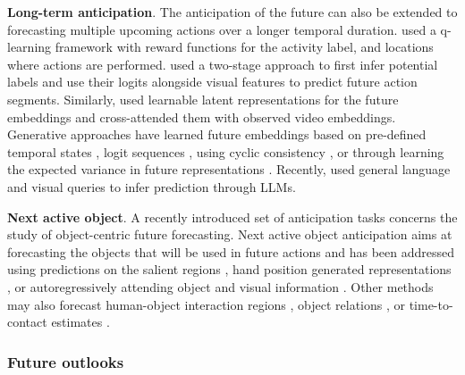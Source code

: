 \noindent
\textbf{Long-term anticipation}. The anticipation of the future can also be extended to forecasting multiple upcoming actions over a longer temporal duration. \citet{bokhari2017long} used a q-learning framework with reward functions for the activity label, and locations where actions are performed. \citet{nawhal2022rethinking} used a two-stage approach to first infer potential labels and use their logits alongside visual features to predict future action segments. Similarly, \citet{gong2022future} used learnable latent representations for the future embeddings and cross-attended \citep{jaegle2021perceiver,lee2019set} them with observed video embeddings. Generative approaches have learned future embeddings based on pre-defined temporal states \citep{piergiovanni2020adversarial}, logit sequences \citep{zhao2020diverse}, using cyclic consistency \citep{abu2021long}, or through learning the expected variance in future representations \citep{mascaro2023intention,patsch2024long}. Recently, \citet{mittal2024can} used general language and visual queries to infer prediction through LLMs.

\noindent
\textbf{Next active object}. A recently introduced set of anticipation tasks concerns the study of object-centric future forecasting. Next active object anticipation aims at forecasting the objects that will be used in future actions and has been addressed using predictions on the salient regions \citep{dessalene2021forecasting}, hand position generated representations \citep{jiang2021predicting}, or autoregressively attending object and visual information \citep{thakur2024anticipating}. Other methods may also forecast human-object interaction regions \citep{liu2020forecasting,liu2022joint,roy2024interaction}, object relations \citep{roy2021action,zatsarynna2021multi}, or time-to-contact estimates \citep{mur2024aff}.

\subsubsection{Future outlooks}

